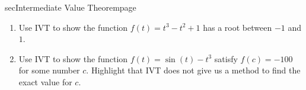 \documentclass[../main]{subfiles}
\begin{document}
\begin{outline}{sec}{Intermediate Value Theorem}{page}
\begin{enumerate}

    \item Use IVT to show the function \(f(t) = t^{3} - t^{2} + 1\) has a root between \(-1\) and \(1\).

    \item Use IVT to show the function \(f(t) = \sin(t) - t^{3}\) satisfy \(f(c) = -100\) for some number \(c\). Highlight that IVT does not give us a method to find the exact value for \(c\).


\end{enumerate}
\end{outline}
\end{document}

